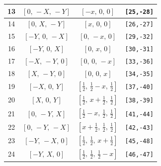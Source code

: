 \documentclass[fleqn,8pt]{jsarticle}
\begin{document}
\begin{longtable}{cccc}
13 & $\left[ 0,\, - X,\, - Y \right]$ & $\left[ - x,\, 0,\, 0 \right]$ & {\tt [25,-28]} \\ \hline
14 & $\left[ 0,\, X,\, - Y \right]$ & $\left[ x,\, 0,\, 0 \right]$ & {\tt [26,-27]} \\ \hline
15 & $\left[ - Y,\, 0,\, - X \right]$ & $\left[ 0,\, - x,\, 0 \right]$ & {\tt [29,-32]} \\ \hline
16 & $\left[ - Y,\, 0,\, X \right]$ & $\left[ 0,\, x,\, 0 \right]$ & {\tt [30,-31]} \\ \hline
17 & $\left[ - X,\, - Y,\, 0 \right]$ & $\left[ 0,\, 0,\, - x \right]$ & {\tt [33,-36]} \\ \hline
18 & $\left[ X,\, - Y,\, 0 \right]$ & $\left[ 0,\, 0,\, x \right]$ & {\tt [34,-35]} \\ \hline
19 & $\left[ - X,\, 0,\, Y \right]$ & $\left[ \frac{1}{2},\, \frac{1}{2} - x,\, \frac{1}{2} \right]$ & {\tt [37,-40]} \\ \hline
20 & $\left[ X,\, 0,\, Y \right]$ & $\left[ \frac{1}{2},\, x + \frac{1}{2},\, \frac{1}{2} \right]$ & {\tt [38,-39]} \\ \hline
21 & $\left[ 0,\, - Y,\, X \right]$ & $\left[ \frac{1}{2} - x,\, \frac{1}{2},\, \frac{1}{2} \right]$ & {\tt [41,-44]} \\ \hline
22 & $\left[ 0,\, - Y,\, - X \right]$ & $\left[ x + \frac{1}{2},\, \frac{1}{2},\, \frac{1}{2} \right]$ & {\tt [42,-43]} \\ \hline
23 & $\left[ - Y,\, - X,\, 0 \right]$ & $\left[ \frac{1}{2},\, \frac{1}{2},\, x + \frac{1}{2} \right]$ & {\tt [45,-48]} \\ \hline
24 & $\left[ - Y,\, X,\, 0 \right]$ & $\left[ \frac{1}{2},\, \frac{1}{2},\, \frac{1}{2} - x \right]$ & {\tt [46,-47]} \\
\end{longtable}
\renewcommand{\arraystretch}{1.2}
\end{document}
